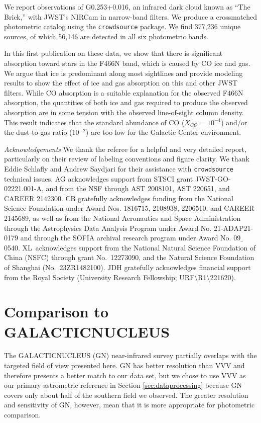 \documentclass[times,astrosymb,twocolumn]{aastex631}
\newcommand\nstarstotal{377,236\xspace}
\newcommand\nstarsallgood{56,146\xspace}
\def\rr#1{#1}
\begin{document}
We report observations of G0.253+0.016, an infrared dark cloud known as ``The Brick,'' with JWST's NIRCam in narrow-band filters.
We produce a crossmatched photometric catalog using the \texttt{crowdsource} package.
We find \nstarstotal unique sources, of which \nstarsallgood are detected in all six photometric bands.

In this first publication on these data, we show that there is significant absorption toward stars in the F466N band, which is caused by CO ice and gas.
We argue that ice is predominant along most sightlines and provide modeling results to show the effect of ice and gas absorption on this and other JWST filters.
While CO absorption is a suitable explanation for the observed F466N absorption, the quantities of both ice and gas required to produce the observed absorption are in some tension with the observed line-of-sight column density.
This result indicates that the standard abundance of CO ($X_{CO}=10^{-4}$) and/or the dust-to-gas ratio (10$^{-2}$) are too low for the Galactic Center environment.



 \textit{Acknowledgements}
 \rr{We thank the referee for a helpful and very detailed report, particularly on their review of labeling conventions and figure clarity.}
 We thank Eddie Schlafly and Andrew Saydjari for their assistance with \texttt{crowdsource} technical issues.
 AG acknowledges support from STSCI grant JWST-GO-02221.001-A, and from the NSF through AST 2008101, AST 220651, and CAREER 2142300.
 CB gratefully  acknowledges  funding  from the National  Science  Foundation  under  Award  Nos. 1816715, 2108938, 2206510, and CAREER 2145689, as well as from the National Aeronautics and Space Administration through the Astrophysics Data Analysis Program under Award No. 21-ADAP21-0179 and through the SOFIA archival research program under Award No.  09$\_$0540. 
 XL\ acknowledges support from the National Natural Science Foundation of China (NSFC) through grant No.\ 12273090, and the Natural Science Foundation of Shanghai (No.\ 23ZR1482100).
 JDH gratefully acknowledges financial support from the Royal Society (University Research Fellowship; URF\textbackslash R1\textbackslash 221620).

 


\appendix

\section{Comparison to GALACTICNUCLEUS}
\label{appendix:galnuc}
The GALACTICNUCLEUS (GN) \rr{near-infrared} survey \citep{Nogueras-Lara2019,Nogueras-Lara2021} partially overlaps with the targeted field of view \rr{presented here}.
\rr{GN} has \rr{better} resolution than VVV and therefore presents a better match to our data set, but we chose to use VVV as our primary astrometric reference in Section \ref{sec:dataprocessing} because GN covers only about half of the southern field we observed.
The \rr{greater} resolution and sensitivity of GN, however, mean that it is more appropriate for photometric comparison.
\end{document}
